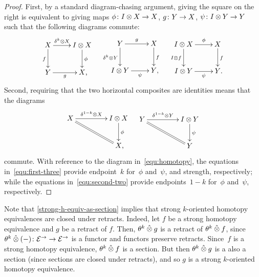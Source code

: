 \documentclass[reqno,10pt,a4paper,oneside,draft]{amsart}
\begin{document}
{{\begin{proof}
First, by a standard diagram-chasing argument, giving the square on the right is equivalent to giving maps $\phi \colon I \otimes X \to X$, $g \colon Y \to X$, $\psi \colon I \otimes Y \to Y$ such that the following diagrams commute:
\begin{align} \label{equ:first-three}
\begin{gathered}
\xymatrix{
  X
  \ar[r]^-{\kcyl \otimes X}
  \ar[d]_f
&
  \interval \otimes X
  \ar[d]^{\phi}
\\
  Y \ar[r]_-{g}
&
  X
\rlap{,}}
\end{gathered}
&&
\begin{gathered}
\xymatrix{
  Y
  \ar[r]^-g
  \ar[d]_{\kcyl \otimes Y}
&
  X
  \ar[d]^f
\\
  \interval \otimes Y
  \ar[r]_-{\psi}
&
  Y
\rlap{,}}
\end{gathered}
&&
\begin{gathered}
\xymatrix{
  \interval \otimes X
  \ar[r]^-\phi
  \ar[d]_{I \otimes f}
&
  X
  \ar[d]^{f}
\\
  \interval \otimes Y
  \ar[r]_-{\psi}
&
  Y
\rlap{.}}
\end{gathered}
\end{align}
Second, requiring that the two horizontal composites are identities means that the diagrams
\begin{align} \label{equ:second-two}
\begin{gathered}
\xymatrix@C+2em{
  X
  \ar[r]^-{\kcylinv \otimes X}
  \ar@{=}[dr]
&
  \interval \otimes X
  \ar[d]^\phi
\\&
  X
\rlap{,}}
\end{gathered}
&&
\begin{gathered}
\xymatrix@C+2em{
  Y
  \ar[r]^-{\kcylinv \otimes Y}
  \ar@{=}[dr]
&
  \interval \otimes Y
  \ar[d]^{\psi}
\\&
  Y
}
\end{gathered}
\end{align}
commute.
With reference to the diagram in~\eqref{equ:homotopy}, the equations in~\eqref{equ:first-three} provide endpoint~$k$ for~$\phi$ and~$\psi$, and strength, respectively; while the equations in~\eqref{equ:second-two} provide endpoints~$1-k$ for~$\phi$ and~$\psi$, respectively.
\end{proof}


Note that \cref{strong-h-equiv-as-section} implies that strong $k$-oriented homotopy equivalences are closed under retracts.
Indeed, let $f$ be a strong homotopy equivalence and $g$ be a retract of $f$. Then, $\theta^k \mathbin{\hat{\otimes}} g$ is a retract of 
$\theta^k \mathbin{\hat{\otimes}} f$, since $\theta^k \mathbin{\hat{\otimes}} (-) \colon \mathcal{E}^\to \to \mathcal{E}^\to$ is a functor and functors preserve retracts.
Since~$f$ is a strong homotopy equivalence, $\theta^k \mathbin{\hat{\otimes}} f$ is a section. But then $\theta^k \mathbin{\hat{\otimes}} g$ is a also
a section (since
sections are closed under retracts), and so $g$ is a strong $k$-oriented homotopy equivalence. 


}}
\end{document}
